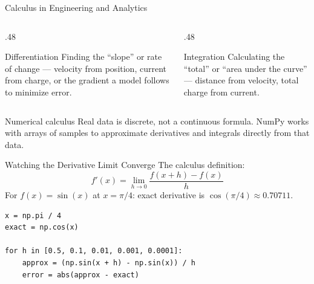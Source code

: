 \documentclass[9pt,aspectratio=169,xcolor=table]{beamer}
\begin{document}
\begin{frame}{Calculus in Engineering and Analytics}
    \leavevmode
    \small
    \begin{columns}[t]
        \begin{column}{.48\textwidth}
            \begin{block}{Differentiation}
                \scriptsize Finding the ``slope'' or rate of change ---
                velocity from position, current from charge, or the
                gradient a model follows to minimize error.
            \end{block}
        \end{column}
        \begin{column}{.48\textwidth}
            \begin{block}{Integration}
                \scriptsize Calculating the ``total'' or ``area under
                the curve'' --- distance from velocity, total charge
                from current.
            \end{block}
        \end{column}
    \end{columns}

    \vspace{3mm}
    \begin{alertblock}{Numerical calculus}
        Real data is discrete, not a continuous formula. NumPy works
        with arrays of samples to approximate derivatives and integrals
        directly from that data.
    \end{alertblock}
\end{frame}

\begin{frame}[fragile]{Watching the Derivative Limit Converge}
    \leavevmode
    \small
    The calculus definition:
    \[
    f'(x) = \lim_{h \to 0} \frac{f(x+h) - f(x)}{h}
    \]
    For $f(x) = \sin(x)$ at $x = \pi/4$: exact derivative is
    $\cos(\pi/4) \approx 0.70711$.

\begin{lstlisting}
x = np.pi / 4
exact = np.cos(x)

for h in [0.5, 0.1, 0.01, 0.001, 0.0001]:
    approx = (np.sin(x + h) - np.sin(x)) / h
    error = abs(approx - exact)
\end{lstlisting}
\end{frame}
\end{document}
